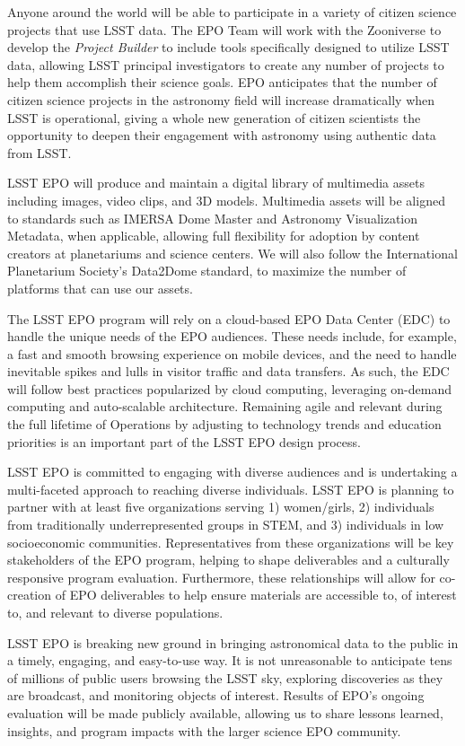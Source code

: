 Anyone around the world will be able to participate in a variety of citizen science projects that use LSST data.  The EPO Team will work with the Zooniverse to develop the \textit{Project Builder} to include tools specifically designed to utilize LSST data, allowing LSST principal investigators to create any number of projects to help them accomplish their science goals. EPO anticipates that the number of citizen science projects in the astronomy field will increase dramatically when LSST is operational, giving a whole new generation of citizen scientists the opportunity to deepen their engagement with astronomy using authentic data from LSST.

LSST EPO will produce and maintain a digital library of multimedia
assets including images, video clips, and 3D models.  Multimedia
assets will be aligned to standards such as IMERSA Dome Master and
Astronomy Visualization Metadata, when applicable, allowing full
flexibility for adoption by content creators at planetariums and
science centers. We will also follow the International Planetarium
Society's Data2Dome standard, to maximize the number of platforms that
can use our assets.

The LSST EPO program will rely on a cloud-based EPO Data Center (EDC) to handle the unique needs of the EPO audiences. These needs include, for example, a fast and smooth browsing experience on mobile devices, and the need to handle inevitable spikes and lulls in visitor traffic and data transfers. As such, the EDC will follow best practices popularized by cloud computing, leveraging on-demand computing and auto-scalable architecture. Remaining agile and relevant during the full lifetime of Operations by adjusting to technology trends and education priorities is an important part of the LSST EPO design process.

LSST EPO is committed to engaging with diverse audiences and is undertaking a multi-faceted approach to reaching diverse individuals.  LSST EPO is planning to partner with at least five organizations serving 1) women/girls, 2) individuals from traditionally underrepresented groups in STEM, and 3) individuals in low socioeconomic communities. Representatives from these organizations will be key stakeholders of the EPO program, helping to shape deliverables and a culturally responsive program evaluation. Furthermore, these relationships will allow for co-creation of EPO deliverables to help ensure materials are accessible to, of interest to, and relevant to diverse populations.

LSST EPO is breaking new ground in bringing astronomical data to the public in a timely, engaging, and easy-to-use way. It is not unreasonable to anticipate tens of millions of public users browsing the LSST sky, exploring discoveries as they are broadcast, and monitoring objects of interest. Results of EPO's ongoing evaluation will be made publicly available, allowing us to share lessons learned, insights, and program impacts with the larger science EPO community.
